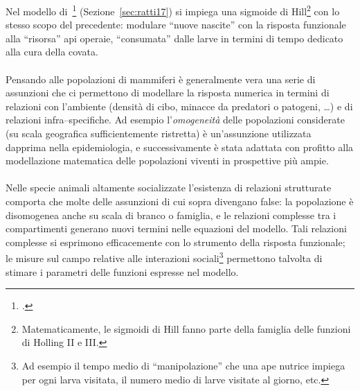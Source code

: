 Nel modello di~\citeauthor{ratti2017}\footcite{ratti2017} (Sezione~\ref{sec:ratti17}) si impiega una sigmoide di Hill\footnote{Matematicamente, le sigmoidi di Hill fanno parte della famiglia delle funzioni di Holling II e III.}
con lo stesso scopo del precedente: modulare ``nuove nascite'' con la risposta funzionale alla ``risorsa'' api operaie,
``consumata'' dalle larve in termini di tempo dedicato alla cura della covata.

\paragraph{}
Pensando alle popolazioni di mammiferi è generalmente vera una serie di assunzioni che ci permettono di modellare la
risposta numerica in termini di relazioni con l'ambiente (densità di cibo, minacce da predatori o patogeni, \dots) e di
relazioni infra--specifiche. Ad esempio l'\emph{omogeneità} delle popolazioni considerate (su scala geografica
sufficientemente ristretta) è un'assunzione utilizzata dapprima nella epidemiologia, e successivamente è stata
adattata con profitto alla modellazione matematica delle popolazioni viventi in prospettive più ampie.

\paragraph{}
Nelle specie animali altamente socializzate l'esistenza di relazioni strutturate comporta che molte delle assunzioni
di cui sopra divengano false: la popolazione è disomogenea anche su scala di branco o famiglia, e le relazioni
complesse tra i compartimenti generano nuovi termini nelle equazioni del modello.
Tali relazioni complesse si esprimono efficacemente con lo strumento della risposta funzionale; le misure sul campo
relative alle interazioni sociali\footnote{Ad esempio il tempo medio di ``manipolazione'' che una ape nutrice impiega per
ogni larva visitata, il numero medio di larve visitate al giorno, etc.}
permettono talvolta di stimare i parametri delle funzioni espresse nel modello.



